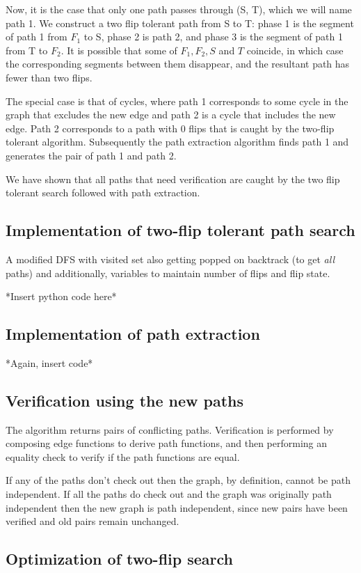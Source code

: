 \documentclass{article}
\begin{document}
Now, it is the case that only one path passes through (S, T), which we will name path 1. We construct a two flip tolerant path from S to T: phase 1 is the segment of path 1 from $F_1$ to S, phase 2 is path 2, and phase 3 is the segment of path 1 from T to $F_2$. It is possible that some of $F_1, F_2, S$ and $T$ coincide, in which case the corresponding segments between them disappear, and the resultant path has fewer than two flips.

The special case is that of cycles, where path 1 corresponds to some cycle in the graph that excludes the new edge and path 2 is a cycle that includes the new edge.
Path 2 corresponds to a path with 0 flips that is caught by the two-flip tolerant algorithm. Subsequently the path extraction algorithm finds path 1 and generates the pair of path 1 and path 2.

We have shown that all paths that need verification are caught by the two flip tolerant search followed with path extraction.

\subsection{Implementation of two-flip tolerant path search}
A modified DFS with visited set also getting popped on backtrack (to get \textit{all} paths) and additionally, variables to maintain number of flips and flip state.

*Insert python code here*

\subsection{Implementation of path extraction}
 *Again, insert code*

\subsection{Verification using the new paths}
The algorithm returns pairs of conflicting paths. Verification is performed by composing edge functions to derive path functions, and then performing an equality check to verify if the path functions are equal.

If any of the paths don't check out then the graph, by definition, cannot be path independent. If all the paths do check out and the graph was originally path independent then the new graph is path independent, since new pairs have been verified and old pairs remain unchanged.

\subsection{Optimization of two-flip search}
\end{document}
